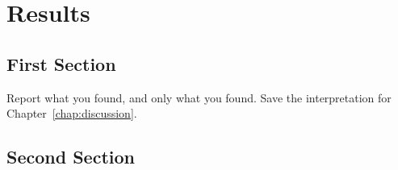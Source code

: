 
\chapter{Results}\label{chap:results}

\section{First Section}

Report what you found, and only what you found. Save the interpretation for
Chapter~\ref{chap:discussion}.

\lipsum[5][1-5]

\section{Second Section}

\lipsum[6][1-5]
